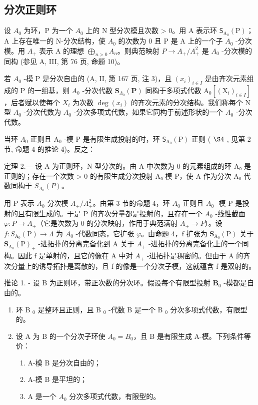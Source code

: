 \subsection{分次正则环}

设 \(A_{0}\) 为环，P 为一个 \(A_{0}\) 上的 N 型分次模且次数 \textgreater{} 0。用 A 表示环 \(\mathsf{S}_{\mathrm{A}_{0}}(\mathrm{P})\)；A 上存在唯一的 N-分次结构，使 \(A_{0}\) 的次数为 0 且 P 是 A 上的一个子 \(A_{0}\) -分次模。用 \(A_{+}\) 表示 A 的理想 \(\bigoplus_{n>0} A_{n}\)。则典范映射 \(P \longrightarrow A_{+}/A_{+}^{2}\) 是 \(A_{0}\) -分次模的同构 (参见 A, III, 第 76 页, 命题 10)。

若 \(A_{0}\) -模 P 是分次自由的 (A, II, 第 167 页, 注 3)，且 \((x_{i})_{i\in I}\) 是由齐次元素组成的 P 的一组基，则 \(A_{0}\) -分次代数 \(\mathbf{S}_{\Lambda_{0}}(\mathbf{P})\) 同构于多项式代数 \(\mathrm{A}_{0}[(\mathrm{X}_{i})_{i\in I}]\)，后者赋以使每个 \(X_{i}\) 为次数 \(\deg(x_{i})\) 的齐次元素的分次结构。我们称每个 N 型 \(A_{0}\) -分次代数为 \(A_{0}\) -分次多项式代数，如果它同构于前述形状的一个 \(A_{0}\) -分次代数。

当环 \(\Lambda_0\) 正则且 \(\mathrm{A}_0\) -模 P 是有限生成投射的时，环 \(\mathsf{S}_{\mathrm{A}_0}(\mathrm{P})\) 正则 ( \(\S 4\) , 见第 2 节, 命题 4 的推论 4)。反之：

定理 2.--- 设 A 为正则环，N 型分次的。由 A 中次数为 0 的元素组成的环 A₀ 是正则的；存在一个次数 \textgreater{} 0 的有限生成分次投射 A₀-模 P，使 A 作为分次 A₀-代数同构于 \(S_{A_{0}}(P)\)。

用 P 表示 \(A_{0}\) 分次模 \(A_{+}/A_{+}^{2}\)。由第 3 节的命题 4，环 \(A_{0}\) 正则且 \(A_{0}\) -模 P 是投射的且有限生成的。于是 P 的齐次分量都是投射的，且存在一个 \(A_{0}\) -线性截面 \(\varphi: P \to A_{+}\)（它是次数为 0 的分次映射，作用于典范满射 \(A_{+} \to P\)）。设 \(f: S_{\mathrm{A}_{0}}(\mathrm{P}) \longrightarrow \Lambda\) 为 \(A_{0}\) -代数同态，它扩张 \(\varphi\)。由命题 4，f 扩张为 \(\mathbf{S}_{\mathrm{A}_{0}}(\mathrm{P})\) 关于 \(\mathbf{S}_{\mathrm{A}_{0}}(\mathrm{P})_{+}\) -进拓扑的分离完备化到 A 关于 \(A_{+}\) -进拓扑的分离完备化上的一个同构。因此 f 是单射的，且它的像在 A 中对 \(A_{+}\) -进拓扑是稠密的。但由于 A 的齐次分量上的诱导拓扑是离散的，且 f 的像是一个分次子模，这就蕴含 f 是双射的。

推论 1. - 设 B 为正则环，带正次数的分次环。假设每个有限型投射 \(\mathbf{B}_0\) -模都是自由的。

\begin{enumerate}
\def\labelenumi{\alph{enumi})}
\item
  环 B \(_{0}\) 是整环且正则，且 B \(_{0}\) -代数 B 是一个 B \(_{0}\) 分次多项式代数，有限型的。
\item
  设 A 为 B 的一个分次子环使 \(A_{0} = B_{0}\)，且 B 是有限生成 A-模。下列条件等价：
  \begin{enumerate}
  \def\labelenumii{(\roman{enumii})}
  \item
    A-模 B 是分次自由的；
  \item
    A-模 B 是平坦的；
  \item
    A 是一个 \(A_{0}\) 分次多项式代数，有限型的。
  \end{enumerate}
\end{enumerate}

